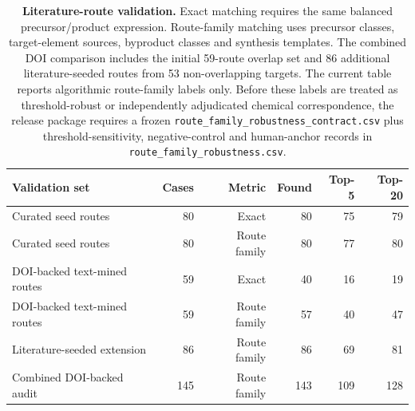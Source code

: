 \documentclass[11pt, letterpaper]{article}
\begin{document}
\begin{table}[p]
\centering
\small
\caption{\textbf{Literature-route validation.} Exact matching requires the same balanced precursor/product expression. Route-family matching uses precursor classes, target-element sources, byproduct classes and synthesis templates. The combined DOI comparison includes the initial 59-route overlap set and 86 additional literature-seeded routes from 53 non-overlapping targets. The current table reports algorithmic route-family labels only. Before these labels are treated as threshold-robust or independently adjudicated chemical correspondence, the release package requires a frozen \texttt{route\_family\_robustness\_contract.csv} plus threshold-sensitivity, negative-control and human-anchor records in \texttt{route\_family\_robustness.csv}.}
\begin{tabular}{lrrrrr}
\toprule
\textbf{Validation set} & \textbf{Cases} & \textbf{Metric} & \textbf{Found} & \textbf{Top-5} & \textbf{Top-20} \\
\midrule
Curated seed routes & 80 & Exact & 80 & 75 & 79 \\
Curated seed routes & 80 & Route family & 80 & 77 & 80 \\
DOI-backed text-mined routes & 59 & Exact & 40 & 16 & 19 \\
DOI-backed text-mined routes & 59 & Route family & 57 & 40 & 47 \\
Literature-seeded extension & 86 & Route family & 86 & 69 & 81 \\
Combined DOI-backed audit & 145 & Route family & 143 & 109 & 128 \\
\bottomrule
\end{tabular}
\label{supp-tab:literature_validation}
\end{table}
\end{document}
